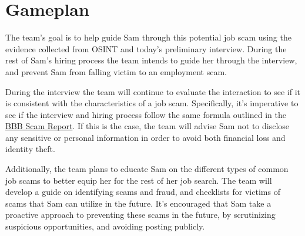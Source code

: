\section{Gameplan} %
\begin{fullwidth}
The team's goal is to help guide Sam through this potential job scam using the evidence collected from OSINT and today's preliminary interview. During the rest of Sam's hiring process the team intends to guide her through the interview, and prevent Sam from falling victim to an employment scam.\\\medskip

During the interview the team will continue to evaluate the interaction to see if it is consistent with the characteristics of a job scam. Specifically, it's imperative to see if the interview and hiring process follow the same formula outlined in the \hyperref[sec:BBB Scam Report]{BBB Scam Report}. If this is the case, the team will advise Sam not to disclose any sensitive or personal information in order to avoid both financial loss and identity theft.\\\medskip

Additionally, the team plans to educate Sam on the different types of common job scams to better equip her for the rest of her job search. The team will develop a guide on identifying scams and fraud, and checklists for victims of scams that Sam can utilize in the future. It's encouraged that Sam take a proactive approach to preventing these scams in the future, by scrutinizing suspicious opportunities, and avoiding posting publicly.
\end{fullwidth}